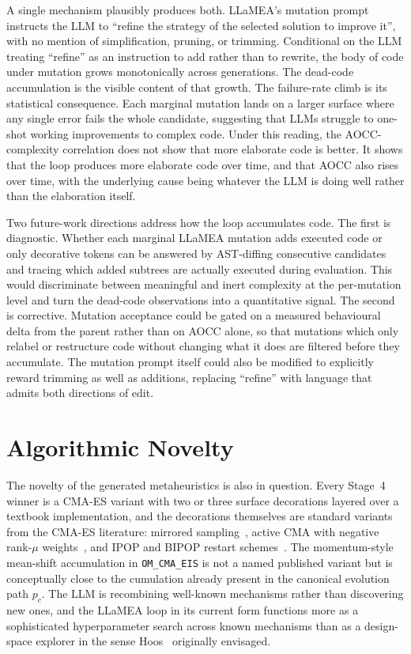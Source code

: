A single mechanism plausibly produces both. LLaMEA's mutation prompt instructs the LLM to ``refine the strategy of the selected solution to improve it'', with no mention of simplification, pruning, or trimming. Conditional on the LLM treating ``refine'' as an instruction to add rather than to rewrite, the body of code under mutation grows monotonically across generations. The dead-code accumulation is the visible content of that growth. The failure-rate climb is its statistical consequence. Each marginal mutation lands on a larger surface where any single error fails the whole candidate, suggesting that LLMs struggle to one-shot working improvements to complex code. Under this reading, the AOCC-complexity correlation does not show that more elaborate code is better. It shows that the loop produces more elaborate code over time, and that AOCC also rises over time, with the underlying cause being whatever the LLM is doing well rather than the elaboration itself.

Two future-work directions address how the loop accumulates code. The first is diagnostic. Whether each marginal LLaMEA mutation adds executed code or only decorative tokens can be answered by AST-diffing consecutive candidates and tracing which added subtrees are actually executed during evaluation. This would discriminate between meaningful and inert complexity at the per-mutation level and turn the dead-code observations into a quantitative signal. The second is corrective. Mutation acceptance could be gated on a measured behavioural delta from the parent rather than on AOCC alone, so that mutations which only relabel or restructure code without changing what it does are filtered before they accumulate. The mutation prompt itself could also be modified to explicitly reward trimming as well as additions, replacing ``refine'' with language that admits both directions of edit.

\section{Algorithmic Novelty}
\label{sec:discussion-novelty}

The novelty of the generated metaheuristics is also in question. Every Stage~4 winner is a CMA-ES variant with two or three surface decorations layered over a textbook implementation, and the decorations themselves are standard variants from the CMA-ES literature: mirrored sampling~\cite{mirrored2010}, active CMA with negative rank-$\mu$ weights~\cite{active2006}, and IPOP and BIPOP restart schemes~\cite{ipop2005, bipop2009}. The momentum-style mean-shift accumulation in \texttt{OM\_CMA\_EIS} is not a named published variant but is conceptually close to the cumulation already present in the canonical evolution path $p_c$. The LLM is recombining well-known mechanisms rather than discovering new ones, and the LLaMEA loop in its current form functions more as a sophisticated hyperparameter search across known mechanisms than as a design-space explorer in the sense Hoos~\cite{hoos2012pbo} originally envisaged.

